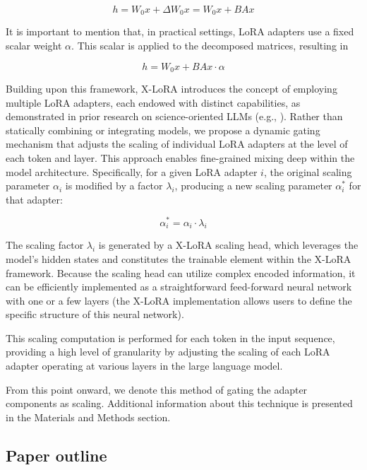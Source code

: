 \begin{equation}
    h = W_0x + \Delta W_0x = W_0x + BAx
\end{equation}

It is important to mention that, in practical settings, LoRA adapters use a fixed scalar weight $\alpha$. This scalar is applied to the decomposed matrices, resulting in

\begin{equation}
    h = W_0x + BAx \cdot \alpha
\end{equation}

Building upon this framework, X-LoRA introduces the concept of employing multiple LoRA adapters, each endowed with distinct capabilities, as demonstrated in prior research on science-oriented LLMs (e.g., \cite{Buehler2023GenerativeDesign}). Rather than statically combining or integrating models, we propose a dynamic gating mechanism that adjusts the scaling of individual LoRA adapters at the level of each token and layer. This approach enables fine-grained mixing deep within the model architecture. Specifically, for a given LoRA adapter $i$, the original scaling parameter $\alpha_i$ is modified by a factor $\lambda_i$, producing a new scaling parameter $\alpha^*_i$ for that adapter:

\begin{equation}
    \alpha^*_i = \alpha_i \cdot \lambda_i
\end{equation}

The scaling factor $\lambda_i$ is generated by a X-LoRA scaling head, which leverages the model’s hidden states and constitutes the trainable element within the X-LoRA framework. Because the scaling head can utilize complex encoded information, it can be efficiently implemented as a straightforward feed-forward neural network with one or a few layers (the X-LoRA implementation allows users to define the specific structure of this neural network).

This scaling computation is performed for each token in the input sequence, providing a high level of granularity by adjusting the scaling of each LoRA adapter operating at various layers in the large language model.

From this point onward, we denote this method of gating the adapter components as scaling. Additional information about this technique is presented in the Materials and Methods section.

\subsection{Paper outline}

